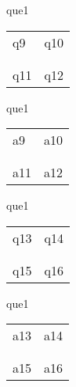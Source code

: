 \documentclass[13.5pt, varwidth=true]{beamer}
\begin{document}
\begin{frame}[shrink=19,fragile]
	\begin{beamercolorbox}[rounded=true, left, shadow=true,wd=14.8cm]{que1}
		\begin{tabular}{p{7cm} | p{7cm}}
			\parbox{7cm}{q9 } & \parbox{7cm}{q10 } \\\\ 
			\hline
			\\ \parbox{7cm}{q11 } & \parbox{7cm}{q12 } \\
		\end{tabular}
	\end{beamercolorbox}
\end{frame}
\begin{frame}[shrink=19,fragile]
	\begin{beamercolorbox}[rounded=true, left, shadow=true,wd=14.8cm]{que1}
		\begin{tabular}{p{7cm} | p{7cm}}
			\textcolor{ared}{a9 }  & \textcolor{ared}{a10 } \\\\ 
			\hline
			\\ \textcolor{ared}{a11 }  & \textcolor{ared}{a12 } \\
		\end{tabular}
	\end{beamercolorbox}
\end{frame}

\begin{frame}[shrink=19,fragile]
	\begin{beamercolorbox}[rounded=true, left, shadow=true,wd=14.8cm]{que1}
		\begin{tabular}{p{7cm} | p{7cm}}
			\parbox{7cm}{q13 } & \parbox{7cm}{q14 } \\\\ 
			\hline
			\\ \parbox{7cm}{q15 } & \parbox{7cm}{q16 } \\
		\end{tabular}
	\end{beamercolorbox}
\end{frame}
\begin{frame}[shrink=19,fragile]
	\begin{beamercolorbox}[rounded=true, left, shadow=true,wd=14.8cm]{que1}
		\begin{tabular}{p{7cm} | p{7cm}}
			\textcolor{ared}{a13 }  & \textcolor{ared}{a14 } \\\\ 
			\hline
			\\ \textcolor{ared}{a15 }  & \textcolor{ared}{a16 } \\
		\end{tabular}
	\end{beamercolorbox}
\end{frame}
\end{document}
